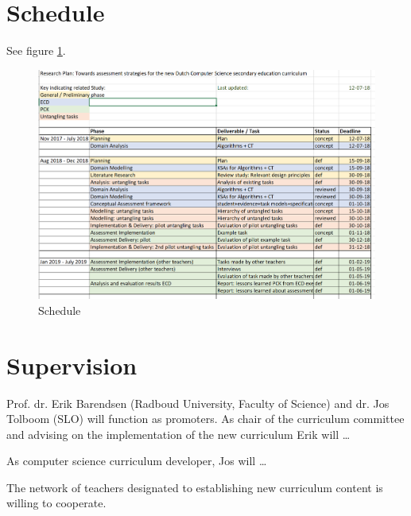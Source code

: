 
\section{Schedule}\label{sec:Schedule}

See figure \ref{fig:schedule}.

\begin{figure}
\includegraphics[scale=0.8]{figures/schedule.png}
\caption{Schedule}\label{fig:schedule}
\end{figure}


\section{Supervision}\label{sec:Supervision}

Prof. dr. Erik Barendsen (Radboud University, Faculty of Science) and dr. Jos Tolboom (SLO) will function as promoters.
As chair of the curriculum committee and advising on the implementation of the new curriculum Erik will \dots

As computer science curriculum developer, Jos will \ldots

The network of teachers designated to establishing new curriculum content is willing to cooperate.
